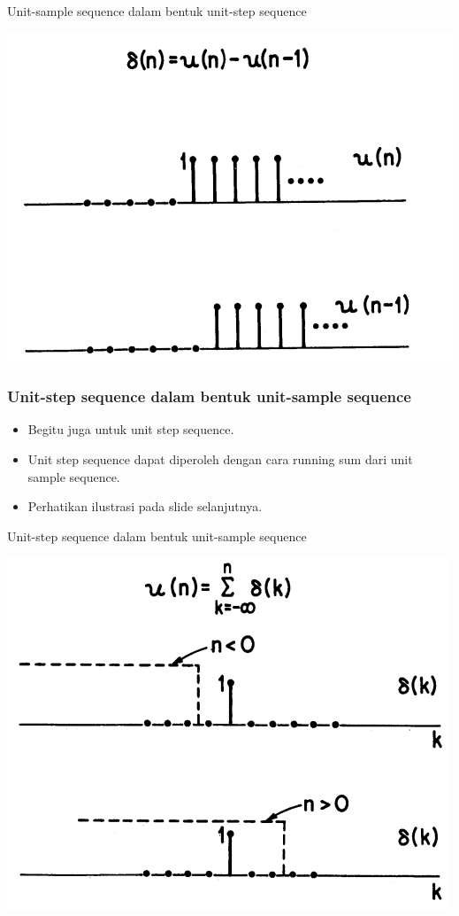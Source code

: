 \documentclass[pdflatex,compress]{beamer}
\begin{document}
\begin{frame}{Unit-sample sequence dalam bentuk unit-step sequence}
	\begin{center}
		\includegraphics[height=0.8\textheight]{img/img007}
	\end{center}
\end{frame}

\begin{frame}
	\frametitle{Unit-step sequence dalam bentuk unit-sample sequence}
	\begin{itemize}
		\item Begitu juga untuk unit step sequence.
		\item Unit step sequence dapat diperoleh dengan cara running sum dari unit sample sequence.
		\item Perhatikan ilustrasi pada slide selanjutnya.
	\end{itemize}
\end{frame}

\begin{frame}{Unit-step sequence dalam bentuk unit-sample sequence}
	\begin{center}
		\includegraphics[height=0.8\textheight]{img/img008}
	\end{center}
\end{frame}
\end{document}
